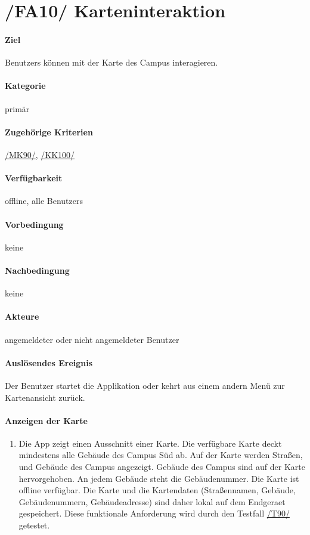 \section[Karteninteraktion]{/FA10/ Karteninteraktion}
\label{/FA10/}
\paragraph{Ziel}
\Glspl{Benutzer} können mit der \Gls{Karte} des \Gls{Campus} interagieren.
\paragraph{Kategorie}
primär
\paragraph{Zugehörige Kriterien}
\hyperref[/MK90/]{/MK90/}, \hyperref[/KK100/]{/KK100/}
\paragraph{Verfügbarkeit}
\gls{offline}, alle \Glspl{Benutzer}
\paragraph{Vorbedingung}
keine
\paragraph{Nachbedingung}
keine
\paragraph{Akteure}
angemeldeter oder nicht angemeldeter \Gls{Benutzer}
\paragraph{Auslösendes Ereignis}
Der \Gls{Benutzer} startet die Applikation oder kehrt aus einem andern Menü zur \Gls{Kartenansicht} zurück.
\paragraph{Anzeigen der Karte}
\begin{enumerate}[start=11, label=\textbf{/FA\arabic*/}, align=left]
    \item \label{/FA11/} Die App zeigt einen Ausschnitt einer \Gls{Karte}. Die verfügbare \Gls{Karte} deckt mindestens alle Gebäude des \Gls{Campus} Süd ab. Auf der \Gls{Karte} werden Straßen, und Gebäude des \Gls{Campus} angezeigt. Gebäude des \Gls{Campus} sind auf der \Gls{Karte} hervorgehoben. An jedem Gebäude steht die Gebäudenummer. Die \Gls{Karte} ist \gls{offline} verfügbar. Die \Gls{Karte} und die Kartendaten (Straßennamen, Gebäude, Gebäudenummern, Gebäudeadresse) sind daher \gls{lokal} auf dem \Gls{Endgeraet} gespeichert. Diese funktionale Anforderung wird durch den Testfall \hyperref[/T90/]{/T90/} getestet.
\end{enumerate}
